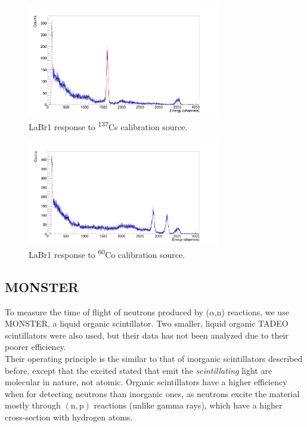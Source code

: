 \documentclass[a4paper,12pt]{report}
\newcommand{\an}{($\alpha$,n) }
\begin{document}
\begin{figure}[H]
	\centering
	\includegraphics[width=0.75\textwidth]{labr_cs137_calibration.png}
	\caption{LaBr1 response to \textsuperscript{137}Cs calibration source.}
	\label{labr_cs137_calibration}
\end{figure}

\begin{figure}[H]
	\centering
	\includegraphics[width=0.75\textwidth]{labr_co60_calibration.png}
	\caption{LaBr1 response to \textsuperscript{60}Co calibration source.}
	\label{labr_co60_calibration}
\end{figure}

\subsection{MONSTER}
To measure the time of flight of neutrons produced by \an reactions, we use MONSTER, a liquid organic scintillator.
Two smaller, liquid organic TADEO scintillators were also used, but their data has not been analyzed due to their poorer efficiency.
\\

Their operating principle is the similar to that of inorganic scintillators described before, except that the excited stated that emit the \textit{scintillating} light are molecular in nature, not atomic.
Organic scintillators have a higher efficiency when for detecting neutrons than inorganic ones, as neutrons excite the material mostly through $\left( \text{n},\text{p}  \right)$ reactions (unlike gamma rays), which have a higher cross-section with hydrogen atoms.
\end{document}

